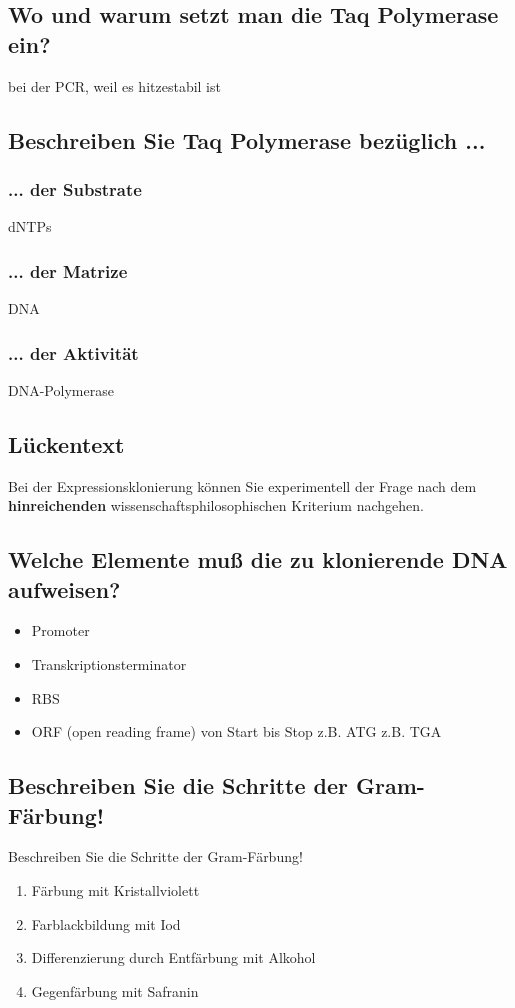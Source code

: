 \documentclass{article}
\begin{document}
\subsection*{Wo und warum setzt man die Taq Polymerase ein?}
bei der PCR, weil es hitzestabil ist
\subsection*{Beschreiben Sie Taq Polymerase bezüglich ...}
\subsubsection*{... der Substrate}
dNTPs
\subsubsection*{... der Matrize}
DNA
\subsubsection*{... der Aktivität}
DNA-Polymerase
\subsection*{Lückentext}
Bei der Expressionsklonierung können Sie experimentell der Frage nach dem \textbf{hinreichenden} wissenschaftsphilosophischen Kriterium nachgehen. 
\subsection*{Welche Elemente muß die zu klonierende DNA aufweisen?}
\begin{itemize}
    \item Promoter
    \item Transkriptionsterminator
    \item RBS
    \item ORF (open reading frame) von Start bis Stop z.B. ATG z.B. TGA
\end{itemize}
\subsection*{Beschreiben Sie die Schritte der Gram-Färbung!}
Beschreiben Sie die Schritte der Gram-Färbung!
\begin{enumerate}
    \item Färbung mit Kristallviolett
    \item Farblackbildung mit Iod
    \item Differenzierung durch Entfärbung mit Alkohol
    \item Gegenfärbung mit Safranin
\end{enumerate}
\end{document}
